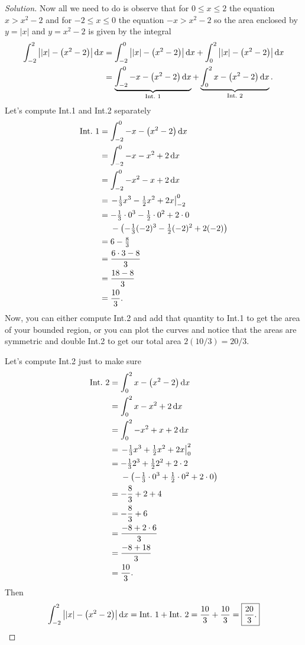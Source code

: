 \documentclass{article}
\theoremstyle{plain}
\theoremstyle{definition}
\theoremstyle{remark}
\DeclareMathOperator{\diff}{d\!}
\begin{document}
\begin{proof}[Solution]
Now all we need to do is observe that for $0\leq x\leq 2$ the equation
$x>x^2-2$ and for $-2\leq x\leq 0$ the equation $-x>x^2-2$ so the area
enclosed by $y=|x|$ and $y=x^2-2$ is given by the integral
\begingroup
\allowdisplaybreaks
\begin{align*}
\int_{-2}^2\left||x|-\left(x^2-2\right)\right|\diff x
&=\int_{-2}^0\left||x|-\left(x^2-2\right)\right|\diff x
+\int_0^2\left||x|-\left(x^2-2\right)\right|\diff x\\
&=\underbrace{\int_{-2}^0-x-\left(x^2-2\right)\diff x}_{\text{Int.\@ 1}}
+\underbrace{\int_0^2x-\left(x^2-2\right)\diff x}_{\text{Int.\@ 2}}.
\end{align*}
\endgroup
Let's compute Int.\@ 1 and Int.\@ 2 separately
\begingroup
\allowdisplaybreaks
\begin{align*}
\text{Int.\@ 1}
&=\int_{-2}^0 -x-\left(x^2-2\right)\diff x\\
&=\int_{-2}^0 -x-x^2+2\diff x\\
&=\int_{-2}^0 -x^2-x+2\diff x\\
&=\left.-\tfrac{1}{3}x^3-\tfrac{1}{2}x^2+2x\right|_{-2}^0\\
&=-\tfrac{1}{3}\cdot 0^3-\tfrac{1}{2}\cdot 0^2+2\cdot 0\\
&\phantom{{}={}}-\left(-\tfrac{1}{3}(-2)^3-\tfrac{1}{2}(-2)^2+2(-2)\right)\\
&=6-\tfrac{8}{3}\\
&=\frac{6\cdot 3-8}{3}\\
&=\frac{18-8}{3}\\
&=\frac{10}{3}.
\end{align*}
\endgroup
Now, you can either compute Int.\@ 2 and add that quantity to Int.\@ 1 to
get the area of your bounded region, or you can plot the curves and notice
that the areas are symmetric and double Int.\@ 2 to get our total area
$\boxed{2(10/3)=20/3}$.

Let's compute Int.\@ 2 just to make sure
\begingroup
\allowdisplaybreaks
\begin{align*}
\text{Int.\@ 2}
&=\int_0^2 x-\left(x^2-2\right)\diff x\\
&=\int_0^2x-x^2+2\diff x\\
&=\int_0^2-x^2+x+2\diff x\\
&=\left.-\tfrac{1}{3}x^3+\tfrac{1}{2}x^2+2x\right|_0^2\\
&=-\tfrac{1}{3}2^3+\tfrac{1}{2}2^2+2\cdot 2\\
&\phantom{{}={}}-\left(-\tfrac{1}{3}\cdot 0^3+\tfrac{1}{2}\cdot 0^2+2\cdot
  0\right)\\
&=-\frac{8}{3}+2+4\\
&=-\frac{8}{3}+6\\
&=\frac{-8+2\cdot 6}{3}\\
&=\frac{-8+18}{3}\\
&=\frac{10}{3}.
\end{align*}
\endgroup
Then
\[
\int_{-2}^2\left||x|-\left(x^2-2\right)\right|\diff x=\text{Int.\@
  1}+\text{Int.\@ 2}=\frac{10}{3}+\frac{10}{3}=\boxed{\frac{20}{3}.}\qedhere
\]
\end{proof}
\end{document}

